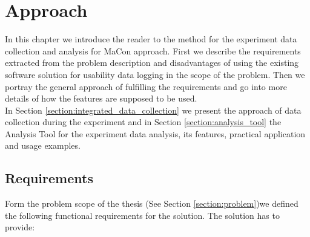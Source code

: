 
\chapter{Approach}\label{chapter:approach}

In this chapter we introduce the reader to the method for the experiment data collection and analysis for MaCon approach. First we describe the requirements extracted from the problem description and disadvantages of using the existing software solution for usability data logging in the scope of the problem. Then we portray the general approach of fulfilling the requirements and go into more details of how the features are supposed to be used. \\

In Section \ref{section:integrated_data_collection} we present the approach of data collection during the experiment and in Section \ref{section:analysis_tool} the Analysis Tool for the experiment data analysis, its features, practical application and usage examples. \\ 

\section{Requirements}
Form the problem scope of the thesis (See Section \ref{section:problem})we defined the following functional requirements for the solution. The solution has to provide:

